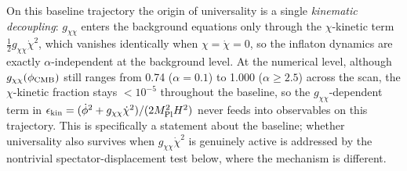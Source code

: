 \documentclass[11pt,a4paper]{article}
\begin{document}
On this baseline trajectory the origin of universality is a single \emph{kinematic decoupling}: $g_{\chi\chi}$ enters the background equations only through the $\chi$-kinetic term $\tfrac{1}{2}g_{\chi\chi}\dot\chi^2$, which vanishes identically when $\chi = \dot\chi = 0$, so the inflaton dynamics are exactly $\alpha$-independent at the background level. At the numerical level, although $g_{\chi\chi}(\phi_{\rm CMB})$ still ranges from 0.74 ($\alpha = 0.1$) to 1.000 ($\alpha \geq 2.5$) across the scan, the $\chi$-kinetic fraction stays $< 10^{-5}$ throughout the baseline, so the $g_{\chi\chi}$-dependent term in $\epsilon_{\rm kin} = (\dot\phi^2 + g_{\chi\chi}\dot\chi^2)/(2M_{\rm Pl}^2 H^2)$ never feeds into observables on this trajectory. This is specifically a statement about the baseline; whether universality also survives when $g_{\chi\chi}\dot\chi^2$ is genuinely active is addressed by the nontrivial spectator-displacement test below, where the mechanism is different.
\end{document}

